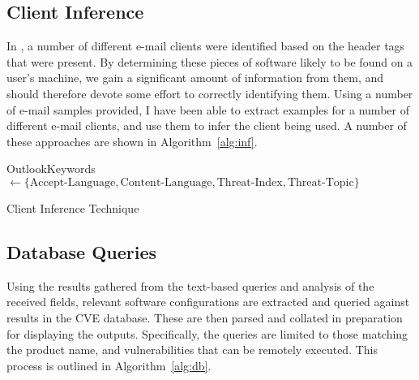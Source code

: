 \subsection{Client Inference}

In \cite{nurse2015investigating}, a number of different e-mail clients were
identified based on the header tags that were present. By determining these
pieces of software likely to be found on a user's machine, we gain a
significant amount of information from them, and should therefore devote some
effort to correctly identifying them.  Using a number of e-mail samples
provided, I have been able to extract examples for a number of different e-mail
clients, and use them to infer the client being used.  A number of these
approaches are shown in Algorithm~\ref{alg:inf}.

\begin{algorithm}
    OutlookKeywords ${}\gets\{ \text{Accept-Language}, \text{Content-Language}, \text{Threat-Index}, \text{Threat-Topic} \}$\;
	\caption{Client Inference Technique}
	\label{alg:inf}
\end{algorithm}


\subsection{Database Queries}

Using the results gathered from the text-based queries and analysis of the
received fields, relevant software configurations are extracted and queried
against results in the CVE database.  These are then parsed and collated in
preparation for displaying the outputs. Specifically, the queries are limited
to those matching the product name, and vulnerabilities that can be remotely
executed.  This process is outlined in Algorithm~\ref{alg:db}.

